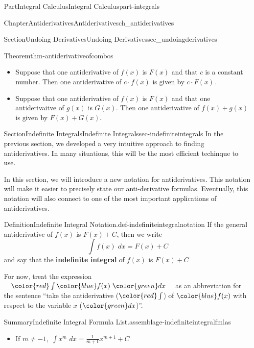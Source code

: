 \documentclass{tufte-book}
\newcommand{\terminology}[1]{\textbf{#1}}
\numberwithin{equation}{chapter}
\newcommand{\red}[1]{   {\color{red}   #1}   }
\newcommand{\blue}[1]{  {\color{blue}  #1}  }
\newcommand{\green}[1]{ {\color{green} #1} }
\newcommand{\intdx}[1]{{\,\int#1\,\,dx}}
\begin{document}
\begin{partptx}{Part}{Integral Calculus}{}{Integral Calculus}{}{}{part-integrals}
\begin{chapterptx}{Chapter}{Antiderivatives}{}{Antiderivatives}{}{}{ch_antiderivatives}
\begin{sectionptx}{Section}{Undoing Derivatives}{}{Undoing Derivatives}{}{}{sec_undoingderivatives}
\begin{theorem}{Theorem}{}{}{thm-antiderivativeofcombos}%
%
\begin{itemize}[label=\textbullet]
\item{}Suppose that one antiderivative of \(f(x)\) is \(F(x)\) and that \(c\) is a constant number. Then one antiderivative of \(c\cdot f(x)\) is given by  \(c\cdot F(x)\).%
\item{}Suppose that one antiderivative of \(f(x)\) is \(F(x)\) and that one antiderivaitve of \(g(x)\) is \(G(x)\). Then one antiderivative of \(f(x)+g(x)\) is given by \(F(x) + G(x)\).%
\end{itemize}
%
\end{theorem}
\end{sectionptx}
%
%
\typeout{************************************************}
\typeout{************************************************}
%
\begin{sectionptx}{Section}{Indefinite Integrals}{}{Indefinite Integrals}{}{}{sec-indefiniteintegrals}
In the previous section, we developed a very intuitive approach to finding antiderivatives. In many situations, this will be the most efficient techinque to use.%
\par
In this section, we will introduce a new notation for antiderivatives. This notation will make it easier to precisely state our anti-derivative formulas. Eventually, this notation will also connect to one of the most important applications of antiderivatives.%
\begin{definition}{Definition}{Indefinite Integral Notation.}{def-indefiniteintegralnotation}%
If the general antiderivative of \(f(x)\) is \(F(x) + C\), then we write%
\begin{equation*}
\intdx{ f(x) } = F(x) + C
\end{equation*}
and say that the \terminology{indefinite integral} of \(f(x)\) is \(F(x)+C\)%
\par
For now, treat the expression \(\quad \red{\int}\, \blue{f(x)}\,\,\green{dx}\quad\) as an abbreviation for the sentence ``take the antiderivative (\(\red{\int}\)) of \(\blue{f(x)}\)  with respect to the variable \(x\) (\(\green{dx}\))''.%
\end{definition}
\begin{assemblage}{Summary}{Indefinite Integral Formula List.}{assemblage-indefiniteintegralfmlas}%
%
\begin{itemize}[label=\textbullet]
\item{}If \(m\neq -1\), \(\intdx{ x^m } = \frac{1}{m+1}x^{m+1} + C \)%

\end{itemize}
\end{assemblage}
\end{sectionptx}
\end{chapterptx}
\end{partptx}
\end{document}
